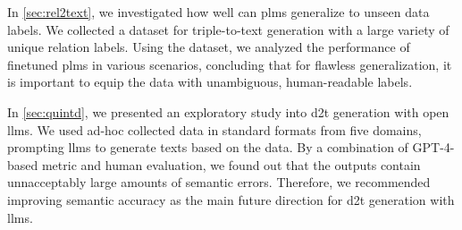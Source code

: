 In \autoref{sec:rel2text}, we investigated how well can \acp{plm} generalize to unseen data labels. We collected a dataset for triple-to-text generation with a large variety of unique relation labels. Using the dataset, we analyzed the performance of finetuned \acp{plm} in various scenarios, concluding that for flawless generalization, it is important to equip the data with unambiguous, human-readable labels.


In \autoref{sec:quintd}, we presented an exploratory study into \ac{d2t} generation with open \acp{llm}. We used ad-hoc collected data in standard formats from five domains, prompting \acp{llm} to generate texts based on the data. By a combination of GPT-4-based metric and human evaluation, we found out that the outputs contain unnacceptably large amounts of semantic errors. Therefore, we recommended improving semantic accuracy as the main future direction for \ac{d2t} generation with \acp{llm}.





